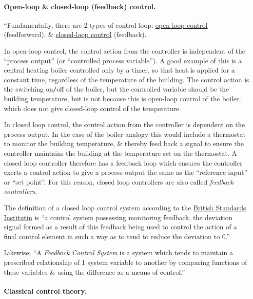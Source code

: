 \documentclass{article}
\begin{document}
\paragraph{Open-loop \& closed-loop (feedback) control.} ``Fundamentally, there are 2 types of control loop: \href{https://en.wikipedia.org/wiki/Open-loop_control}{open-loop control} (feedforward), \& \href{https://en.wikipedia.org/wiki/Closed-loop_control}{closed-loop control} (feedback).

In open-loop control, the control action from the controller is independent of the ``process output'' (or ``controlled process variable''). A good example of this is a central heating boiler controlled only by a timer, so that heat is applied for a constant time, regardless of the temperature of the building. The control action is the switching on{\tt/}off of the boiler, but the controlled variable should be the building temperature, but is not because this is open-loop control of the boiler, which does not give closed-loop control of the temperature.

In closed loop control, the control action from the controller is dependent on the process output. In the case of the boiler analogy this would include a thermostat to monitor the building temperature, \& thereby feed back a signal to ensure the controller maintains the building at the temperature set on the thermostat. A closed loop controller therefore has a feedback loop which ensures the controller exerts a control action to give a process output the same as the ``reference input'' or ``set point''. For this reason, closed loop controllers are also called {\it feedback controllers}.

The definition of a closed loop control system according to the \href{https://en.wikipedia.org/wiki/British_Standards_Institution}{British Standards Institutin} is ``a control system possessing monitoring feedback, the deviation signal formed as a result of this feedback being used to control the action of a final control element in such a way as to tend to reduce the deviation to 0.''

Likewise; ``A {\it Feedback Control System} is a system which tends to maintain a prescribed relationship of 1 system variable to another by comparing functions of these variables \& using the difference as a means of control.''

\paragraph{Classical control theory.}
\end{document}
